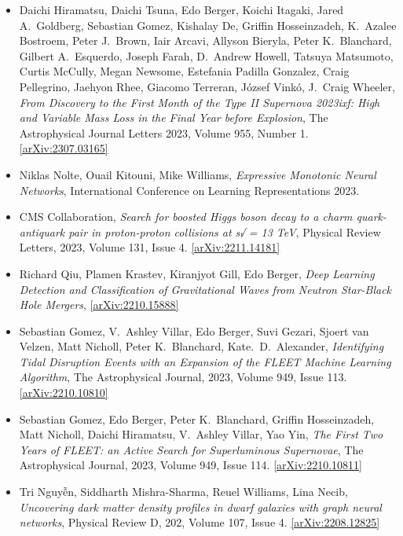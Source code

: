 \begin{itemize}
\item Daichi Hiramatsu, Daichi Tsuna, Edo Berger, Koichi Itagaki, Jared A.\  Goldberg, Sebastian Gomez, Kishalay De, Griffin Hosseinzadeh, K.\  Azalee Bostroem, Peter J.\  Brown, Iair Arcavi, Allyson Bieryla, Peter K.\  Blanchard, Gilbert A.\  Esquerdo, Joseph Farah, D.\  Andrew Howell, Tatsuya Matsumoto, Curtis McCully, Megan Newsome, Estefania Padilla Gonzalez, Craig Pellegrino, Jaehyon Rhee, Giacomo Terreran, József Vinkó, J.\  Craig Wheeler, \textit{From Discovery to the First Month of the Type II Supernova 2023ixf: High and Variable Mass Loss in the Final Year before Explosion}, The Astrophysical Journal Letters 2023, Volume 955, Number 1. \href{https://arxiv.org/abs/2307.03165}{[arXiv:2307.03165]} 
\item Niklas Nolte, Ouail Kitouni, Mike Williams, \textit{Expressive Monotonic Neural Networks}, International Conference on Learning Representations 2023. 
\item CMS Collaboration, \textit{Search for boosted Higgs boson decay to a charm quark-antiquark pair in proton-proton collisions at s√ = 13 TeV}, Physical Review Letters, 2023, Volume 131, Issue 4. \href{https://arxiv.org/abs/2211.14181}{[arXiv:2211.14181]} 
\item Richard Qiu, Plamen Krastev, Kiranjyot Gill, Edo Berger, \textit{Deep Learning Detection and Classification of Gravitational Waves from Neutron Star-Black Hole Mergers}, \href{https://arxiv.org/abs/2210.15888}{[arXiv:2210.15888]} 
\item Sebastian Gomez, V.\  Ashley Villar, Edo Berger, Suvi Gezari, Sjoert van Velzen, Matt Nicholl, Peter K.\  Blanchard, Kate.\  D.\  Alexander, \textit{Identifying Tidal Disruption Events with an Expansion of the FLEET Machine Learning Algorithm}, The Astrophysical Journal, 2023, Volume 949, Issue 113. \href{https://arxiv.org/abs/2210.10810}{[arXiv:2210.10810]} 
\item Sebastian Gomez, Edo Berger, Peter K.\  Blanchard, Griffin Hosseinzadeh, Matt Nicholl, Daichi Hiramatsu, V.\  Ashley Villar, Yao Yin, \textit{The First Two Years of FLEET: an Active Search for Superluminous Supernovae}, The Astrophysical Journal, 2023, Volume 949, Issue 114. \href{https://arxiv.org/abs/2210.10811}{[arXiv:2210.10811]} 
\item Tri Nguyễn, Siddharth Mishra-Sharma, Reuel Williams, Lina Necib, \textit{Uncovering dark matter density profiles in dwarf galaxies with graph neural networks}, Physical Review D, 202, Volume 107, Issue 4. \href{https://arxiv.org/abs/2208.12825}{[arXiv:2208.12825]} 

\end{itemize}
